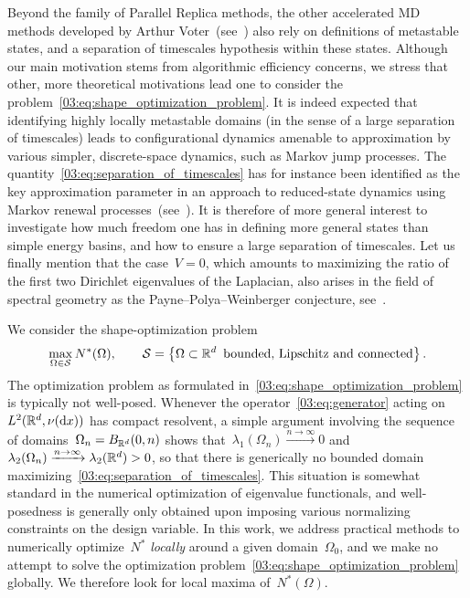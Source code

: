     Beyond the family of Parallel Replica methods, the other accelerated MD methods developed by Arthur Voter~(see~\cite{V97,SV00}) also rely on definitions of metastable states, and a separation of timescales hypothesis within these states.
    Although our main motivation stems from algorithmic efficiency concerns, we stress that other, more theoretical motivations lead one to consider the problem~\eqref{03:eq:shape_optimization_problem}.
    It is indeed expected that identifying highly locally metastable domains (in the sense of a large separation of timescales) leads to configurational dynamics amenable to approximation by various simpler, discrete-space dynamics, such as Markov jump processes.  The quantity~\eqref{03:eq:separation_of_timescales} has for instance been identified as the key approximation parameter in  an approach to reduced-state dynamics using Markov renewal processes~(see~\cite{AJP23}).
    It is therefore of more general interest to investigate how much freedom one has in defining more general states than simple energy basins, and how to ensure a large separation of timescales.
    Let us finally mention that the case~$V=0$, which amounts to maximizing the ratio of the first two Dirichlet eigenvalues of the Laplacian, also arises in the field of spectral geometry as the Payne--Polya--Weinberger conjecture, see~\cite{PPW56,AB92}.
    
    We consider the shape-optimization problem
    \begin{equation}
        \label{03:eq:shape_optimization_problem}
        \underset{\Omega\in \mathcal S}{\max}\,N^*(\Omega),\qquad \mathcal S=\left\{\Omega\subset \mathbb{R}^d\,\text{ bounded, Lipschitz and connected}\right\}.
    \end{equation}
    The optimization problem as formulated in~\eqref{03:eq:shape_optimization_problem} is typically not well-posed. Whenever the operator~\eqref{03:eq:generator} acting on~$L^2(\mathbb{R}^d,\nu(\mathrm{d} x))$ has compact resolvent, a simple argument involving the sequence of domains~$\Omega_n = B_{\mathbb{R}^d}(0,n)$ shows that~$\lambda_1(\Omega_n)\xrightarrow{n\to\infty}0$ and~$\lambda_2(\Omega_n)\xrightarrow{n\to\infty}\lambda_2(\mathbb{R}^d)>0$, so that there is generically no bounded domain maximizing~\eqref{03:eq:separation_of_timescales}.
    This situation is somewhat standard in the numerical optimization of eigenvalue functionals, and well-posedness is generally only obtained upon imposing various normalizing constraints on the design variable.
    In this work, we address practical methods to numerically optimize~$N^*$ \textit{locally} around a given domain~$\Omega_0$, and we make no attempt to solve the optimization problem~\eqref{03:eq:shape_optimization_problem} globally. We therefore look for local maxima of~$N^*(\Omega)$.
    

